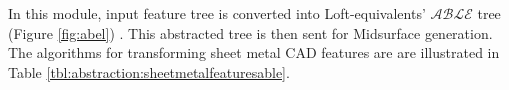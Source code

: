 
In this module, input feature tree is converted into Loft-equivalents' {\bf $\mathcal{ABLE}$} tree (Figure \ref{fig:abel}) \cite{YogeshIITG2014}. This abstracted tree is then sent for Midsurface generation. 
The algorithms for transforming sheet metal CAD features are are illustrated in Table \ref{tbl:abstraction:sheetmetalfeaturesable}.

